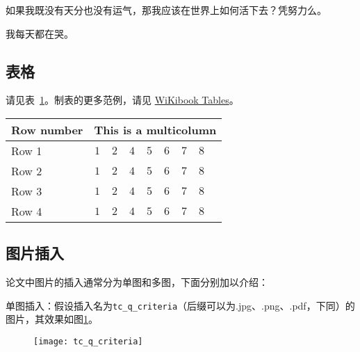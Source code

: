 \begin{lem}\label{lemma:bedsheet}
	如果我既没有天分也没有运气，那我应该在世界上如何活下去？凭努力么。
\end{lem}


\begin{exmp}
	我每天都在哭。
\end{exmp}


\subsection{表格}

请见表~\ref{tab:sample}。制表的更多范例，请见 \href{https://en.wikibooks.org/wiki/LaTeX/Tables}{WiKibook Tables}。
\begin{table}[!htbp]
    \label{tab:sample}
    \centering
    \footnotesize%
    \setlength{\tabcolsep}{4pt}%
    \renewcommand{\arraystretch}{1.2}%
    \begin{tabular}{lcccccccc}
        \hline
        Row number & \multicolumn{8}{c}{This is a multicolumn} \\
        \hline
        Row 1 & $1$ & $2$ & $4$ & $5$ & $6$ & $7$ & $8$\\
        Row 2 & $1$ & $2$ & $4$ & $5$ & $6$ & $7$ & $8$\\
        Row 3 & $1$ & $2$ & $4$ & $5$ & $6$ & $7$ & $8$\\
        Row 4 & $1$ & $2$ & $4$ & $5$ & $6$ & $7$ & $8$\\
        \hline
    \end{tabular}
\end{table}

\subsection{图片插入}

论文中图片的插入通常分为单图和多图，下面分别加以介绍：

单图插入：假设插入名为\verb|tc_q_criteria|（后缀可以为.jpg、.png、.pdf，下同）的图片，其效果如图\ref{fig:tc_q_criteria}。
\begin{figure}[!htbp]
    \centering
    \texttt{[image: tc\_q\_criteria]}
    \label{fig:tc_q_criteria}
\end{figure}

